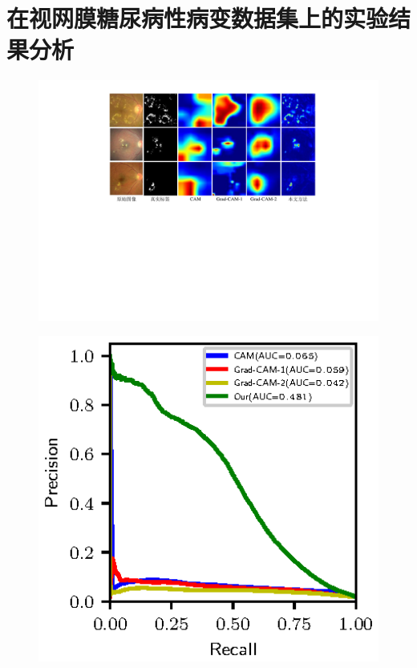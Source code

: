 \section{在视网膜糖尿病性病变数据集上的实验结果分析}


\begin{figure}[h]
	\centering
	\includegraphics[width=1.0\textwidth]{figure/retinal_image_res.pdf}
	\caption{} 
	\label{fig:retinal_image_res}
\end{figure}


\begin{figure}[h]
	\centering
	\includegraphics[width=1.0\textwidth]{figure/pr_curve_retinal_image/pr_curve.eps}
	\caption{} 
	\label{fig:retinal_image_pr_curve}
\end{figure}
